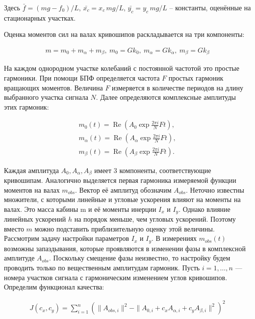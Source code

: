 Здесь $\bar{f} = \left(mg - f_0\right)/L$, $\bar{x_c} = x_c\,mg/L$, $\bar{y_c} = y_c\,mg/L$ -- константы, оценённые на стационарных участках.

Оценка моментов сил на валах кривошипов раскладывается на три компоненты:

\begin{equation}
\begin{aligned}
	m = m_0 + m_{\alpha} + m_{\beta},~m_0 = Gk_0,~m_{\alpha} = Gk_{\alpha},~m_{\beta} = Gk_{\beta}
\end{aligned}
\end{equation}

На каждом однородном участке колебаний с постоянной частотой это простые гармоники. При помощи БПФ определяется частота $F$ простых гармоник вращающих моментов. Величина $F$ измеряется в количестве периодов на длину выбранного участка сигнала $N$.
Далее определяются комплексные амплитуды этих гармоник:

\begin{equation}
\begin{aligned}
	m_0(t) = \operatorname{Re}\left(A_0 \exp{\frac{2\pi i}{N}Ft}\right),\\
	m_{\alpha}(t) = \operatorname{Re}\left(A_{\alpha} \exp{\frac{2\pi i}{N}Ft}\right),\\
	m_{\beta}(t) = \operatorname{Re}\left(A_{\beta} \exp{\frac{2\pi i}{N}Ft}\right).
\end{aligned}
\end{equation}

Каждая амплитуда $A_0, A_{\alpha}, A_{\beta}$ имеет 3 компоненты, соответствующие кривошипам. Аналогично выделяется первая гармоника измеряемой функции моментов на валах $m_{obs}$. Вектор её амплитуд обозначим $A_{obs}$. Неточно известны множители, с которыми линейные и угловые ускорения влияют на моменты на валах. Это масса кабины m и её моменты инерции $I_x$ и $I_y$. Однако влияние линейных ускорений $h$ на порядок меньше, чем угловых ускорений. Поэтому вместо $m$ можно подставить приблизительную оценку этой величины. Рассмотрим задачу настройки параметров $I_x$ и $I_y$. В измерениях $m_{obs}(t)$ возможны запаздывания, которые проявляются в изменении фазы в комплексной амплитуде $A_{obs}$. Поскольку смещение фазы неизвестно, то настройку будем проводить только по вещественным амплитудам гармоник. Пусть $i = 1,\ldots,n$ — номера участков сигнала с гармоническим изменением углов кривошипов. Определим функционал качества:

\begin{equation}
\begin{aligned}
	J\left(c_x,c_y\right) = \sum^n_{i=1}\left(\|A_{obs,i}\|^2 - \|A_{0,i} + c_xA_{\alpha,i} + c_yA_{\beta,i}\|^2\right)^2
\end{aligned}
\end{equation}


